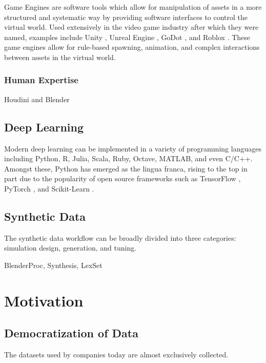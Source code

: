 \documentclass{article}
\begin{document}
Game Engines are software tools which allow for manipulation of assets in a more structured and systematic way by providing software interfaces to control the virtual world. Used extensively in the video game industry after which they were named, examples include Unity \citep{unity3d}, Unreal Engine \citep{unrealengine}, GoDot \citep{godot}, and Roblox \citep{roblox}. These game engines allow for rule-based spawning, animation, and complex interactions between assets in the virtual world.

\subsubsection{Human Expertise}
\label{sec:humanexpertise}

Houdini \citep{houdini} and Blender \citep{blender}

\subsection{Deep Learning}
\label{sec:deeplearning}

Modern deep learning can be implemented in a variety of programming languages including Python, R, Julia, Scala, Ruby, Octave, MATLAB, and even C/C++. Amongst these, Python has emerged as the lingua franca, rising to the top in part due to the popularity of open source frameworks such as TensorFlow \citep{tensorflow}, PyTorch \citep{pytorch}, and Scikit-Learn \citep{scikit-learn}.

\subsection{Synthetic Data}
\label{sec:syntheticdata}

The synthetic data workflow can be broadly divided into three categories: simulation design, generation, and tuning.

BlenderProc, Synthesis, LexSet

\section{Motivation}
\label{sec:motivation}

\subsection{Democratization of Data}

The datasets used by companies today are almost exclusively collected.
\end{document}
